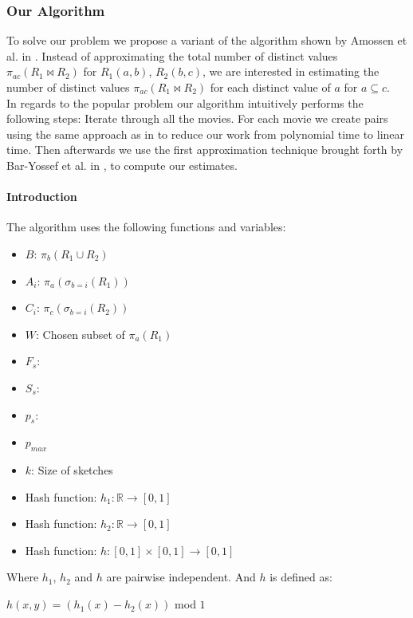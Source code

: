 \documentclass[a4paper,11pt]{article}
\begin{document}
\subsubsection{Our Algorithm}
\label{subsub:alg}
To solve our problem we propose a variant of the algorithm shown by Amossen et al. in \cite{paper:Amossen}. Instead of approximating the total number of distinct values $\pi_{ac}(R_1 \Join R_2)$ for $R_1(a,b)$, $R_2(b,c)$, we are interested in estimating the number of distinct values $\pi_{ac}(R_1 \Join R_2)$ for each distinct value of $a$ for $a \subseteq c$.\\ %
In regards to the popular problem our algorithm intuitively performs the following steps: Iterate through all the movies. For each movie we create pairs using the same approach as in \cite{paper:Amossen} to reduce our work from polynomial time to linear time. Then afterwards we use the first approximation technique brought forth by Bar-Yossef et al. in \cite{paper:Bar-Yossef}, to compute our estimates.

\paragraph{Introduction}
The algorithm uses the following functions and variables:

\begin{itemize}
  \item $B$: $\pi_{b}(R_1 \cup R_2)$
  \item $A_i$: $\pi_{a}(\sigma_{b=i}(R_1))$
  \item $C_i$: $\pi_{c}(\sigma_{b=i}(R_2))$
  \item $W$: Chosen subset of $\pi_{a}(R_1)$
  \item $F_s$:
  \item $S_s$:
  \item $p_s$:
  \item $p_{max}$
  \item $k$: Size of sketches
  \item Hash function: $h_1 : \mathbb{R} \rightarrow [0,1]$
  \item Hash function: $h_2 : \mathbb{R} \rightarrow [0,1]$
  \item Hash function: $h : [0,1] \times [0,1] \rightarrow [0,1]$
\end{itemize}
Where $h_1$, $h_2$ and $h$ are pairwise independent. And $h$ is defined as:
\begin{center}
$h(x,y) = (h_1(x) - h_2(x))$ mod $1$
\end{center}
\end{document}
